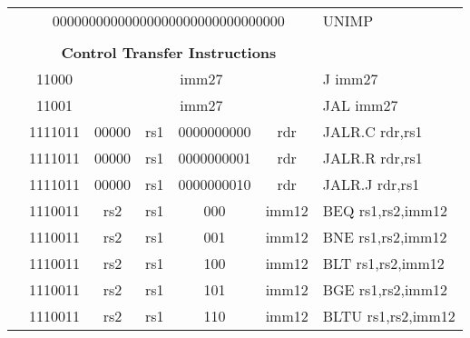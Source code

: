 \begin{table}[p]
\begin{small}
\begin{center}
\begin{tabular}{rcccccccccccl}
&
\multicolumn{11}{|c|}{00000000000000000000000000000000} & UNIMP \\
\cline{2-12}
  

&
\multicolumn{11}{c}{} & \\
&
\multicolumn{11}{c}{\bf Control Transfer Instructions} & \\
\cline{2-12}
  

&
\multicolumn{1}{|c|}{11000} &
\multicolumn{10}{c|}{imm27} & J imm27 \\
\cline{2-12}
  

&
\multicolumn{1}{|c|}{11001} &
\multicolumn{10}{c|}{imm27} & JAL imm27 \\
\cline{2-12}
  

&
\multicolumn{2}{|c|}{1111011} &
\multicolumn{1}{c|}{00000} &
\multicolumn{1}{c|}{rs1} &
\multicolumn{6}{c|}{0000000000} &
\multicolumn{1}{c|}{rdr} & JALR.C rdr,rs1 \\
\cline{2-12}
  

&
\multicolumn{2}{|c|}{1111011} &
\multicolumn{1}{c|}{00000} &
\multicolumn{1}{c|}{rs1} &
\multicolumn{6}{c|}{0000000001} &
\multicolumn{1}{c|}{rdr} & JALR.R rdr,rs1 \\
\cline{2-12}
  

&
\multicolumn{2}{|c|}{1111011} &
\multicolumn{1}{c|}{00000} &
\multicolumn{1}{c|}{rs1} &
\multicolumn{6}{c|}{0000000010} &
\multicolumn{1}{c|}{rdr} & JALR.J rdr,rs1 \\
\cline{2-12}
  

&
\multicolumn{2}{|c|}{1110011} &
\multicolumn{1}{c|}{rs2} &
\multicolumn{1}{c|}{rs1} &
\multicolumn{2}{c|}{000} &
\multicolumn{5}{c|}{imm12} & BEQ rs1,rs2,imm12 \\
\cline{2-12}
  

&
\multicolumn{2}{|c|}{1110011} &
\multicolumn{1}{c|}{rs2} &
\multicolumn{1}{c|}{rs1} &
\multicolumn{2}{c|}{001} &
\multicolumn{5}{c|}{imm12} & BNE rs1,rs2,imm12 \\
\cline{2-12}
  

&
\multicolumn{2}{|c|}{1110011} &
\multicolumn{1}{c|}{rs2} &
\multicolumn{1}{c|}{rs1} &
\multicolumn{2}{c|}{100} &
\multicolumn{5}{c|}{imm12} & BLT rs1,rs2,imm12 \\
\cline{2-12}
  

&
\multicolumn{2}{|c|}{1110011} &
\multicolumn{1}{c|}{rs2} &
\multicolumn{1}{c|}{rs1} &
\multicolumn{2}{c|}{101} &
\multicolumn{5}{c|}{imm12} & BGE rs1,rs2,imm12 \\
\cline{2-12}
  

&
\multicolumn{2}{|c|}{1110011} &
\multicolumn{1}{c|}{rs2} &
\multicolumn{1}{c|}{rs1} &
\multicolumn{2}{c|}{110} &
\multicolumn{5}{c|}{imm12} & BLTU rs1,rs2,imm12 \\
\cline{2-12}
  


\end{tabular}
\end{center}
\end{small}
\end{table}
